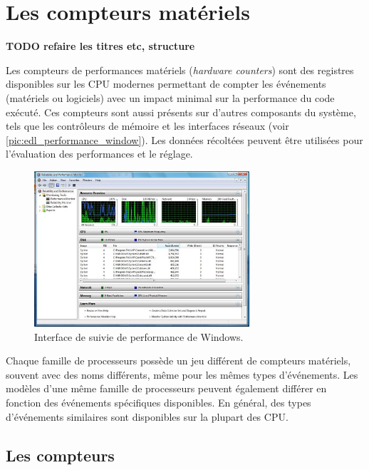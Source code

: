 \chapter{Les compteurs matériels}\label{annexe:hardware_counter}

    \textbf{TODO refaire les titres etc, structure}

    Les compteurs de performances matériels (\textit{hardware counters}) sont des registres disponibles sur les CPU modernes permettant de compter les événements (matériels ou logiciels) avec un impact minimal sur la performance du code exécuté. Ces compteurs sont aussi présents sur d'autres composants du système, tels que les contrôleurs de mémoire et les interfaces réseaux (voir \autoref{pic:edl_performance_window}). Les données récoltées peuvent être utilisées pour l'évaluation des performances et le réglage. 
    
    
    \begin{figure}[h!]
        \center
        \includegraphics[width=8cm]{images/edl_performance_window.jpg}
        \caption{\label{pic:edl_performance_window}Interface de suivie de performance de Windows.}
    \end{figure}
    
    
    
    Chaque famille de processeurs possède un jeu différent de compteurs matériels, souvent avec des noms différents, même pour les mêmes types d'événements. Les modèles d'une même famille de processeurs peuvent également différer en fonction des événements spécifiques disponibles. En général, des types d'événements similaires sont disponibles sur la plupart des CPU.

    
    

\section{Les compteurs}
    
